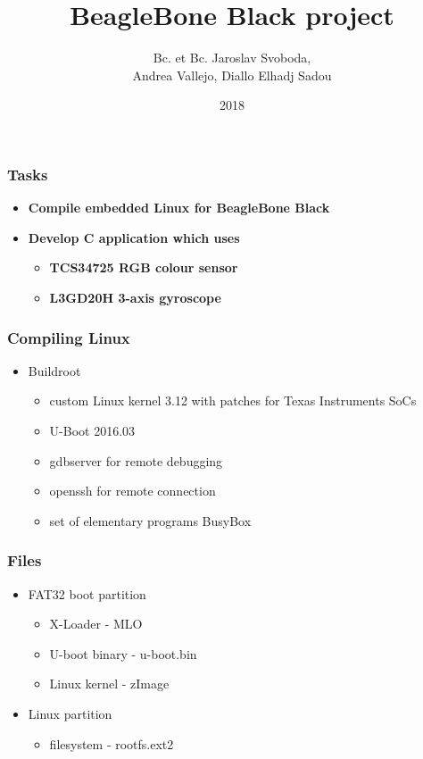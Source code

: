 \documentclass{beamer}
\title{BeagleBone Black project}
\author{Bc. et Bc. Jaroslav Svoboda, \\Andrea Vallejo, Diallo Elhadj Sadou}
\institute{Advanced Digital Architectures}
\date{2018}
\begin{document}
\frame{\titlepage}
\begin{frame}
	\frametitle{Tasks}
		\begin{itemize}
			\item \textbf{Compile embedded Linux for BeagleBone Black}
			\item \textbf{Develop C application which uses}
			\begin{itemize}
				\item \textbf{TCS34725 RGB colour sensor}
				\item \textbf{L3GD20H 3-axis gyroscope}
			\end{itemize}
		\end{itemize}
\end{frame}
\begin{frame}
	\frametitle{Compiling Linux}
		\begin{itemize}
			\item Buildroot
			\begin{itemize}
				\item custom Linux kernel 3.12 with patches for Texas Instruments SoCs
				\item U-Boot 2016.03
				\item gdbserver for remote debugging
				\item openssh for remote connection
				\item set of elementary programs BusyBox
			\end{itemize}
		\end{itemize}
\end{frame}

\begin{frame}
	\frametitle{Files}
		\begin{itemize}
			\item FAT32 boot partition
			\begin{itemize}
				\item X-Loader - MLO
				\item U-boot binary - u-boot.bin
				\item Linux kernel - zImage
			\end{itemize}
		\item Linux partition
			\begin{itemize}
				\item filesystem - rootfs.ext2
			\end{itemize}
		\end{itemize}
\end{frame}
\end{document}
